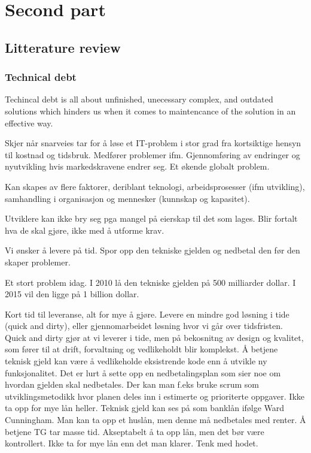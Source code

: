 \part{Second part}
\chapter{Litterature review}


\section{Technical debt}
Techincal debt is all about unfinished, unecessary complex, and outdated solutions which hinders us when it comes to maintencance of the solution in an effective way. 

Skjer når snarveies tar for å løse et IT-problem i stor grad fra kortsiktige hensyn til kostnad og tidsbruk. Medfører problemer ifm. Gjennomføring av endringer og nyutvikling hvis markedskravene endrer seg. Et økende globalt problem. 

Kan skapes av flere faktorer, deriblant teknologi, arbeidsprosesser (ifm utvikling), samhandling i organisasjon og mennesker (kunnskap og kapasitet).

Utviklere kan ikke bry seg pga mangel på eierskap til det som lages. Blir fortalt hva de skal gjøre, ikke med å utforme krav.

Vi ønsker å levere på tid. Spor opp den tekniske gjelden og nedbetal den før den skaper problemer.

Et stort problem idag. I 2010 lå den tekniske gjelden på 500 milliarder dollar. I 2015 vil den ligge på 1 billion dollar.

Kort tid til leveranse, alt for mye å gjøre. Levere en mindre god løsning i tide (quick and dirty), eller gjennomarbeidet løsning hvor vi går over tidsfristen. Quick and dirty gjør at vi leverer i tide, men på bekosnitng av design og kvalitet, som fører til at drift, forvaltning og vedlikeholdt blir komplekst. Å betjene teknisk gjeld kan være å vedlikeholde eksistrende kode enn å utvikle ny funksjonalitet. Det er lurt å sette opp en nedbetalingsplan som sier noe om hvordan gjelden skal nedbetales. Der kan man f.eks bruke scrum som utviklingsmetodikk hvor planen deles inn i estimerte og prioriterte oppgaver. Ikke ta opp for mye lån heller. Teknisk gjeld kan ses på som banklån ifølge Ward Cunningham. Man kan ta opp et huslån, men denne må nedbetales med renter. Å betjene TG tar masse tid. Akseptabelt å ta opp lån, men det bør være kontrollert. Ikke ta for mye lån enn det man klarer. Tenk med hodet. 


